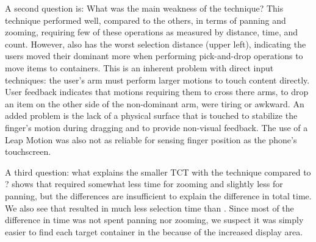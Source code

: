 A second question is: What was the main weakness of the  technique? This technique performed well, compared to the others, in terms of panning and zooming, requiring few of these operations as measured by distance, time, and count. However,  also has the worst selection distance  (upper left), indicating the users moved their dominant more when performing pick-and-drop operations to move items to containers. This is an inherent problem with direct input techniques: the user's arm must perform larger motions to touch content directly. User feedback indicates that motions requiring them to cross there arms, to drop an item on the other side of the non-dominant arm, were tiring or awkward. An added problem is the lack of a physical surface that is touched to stabilize the finger's motion during dragging and to provide non-visual feedback. The use of a Leap Motion was also not as reliable for sensing finger position as the phone's touchscreen.

A third question: what explains the smaller TCT with the  technique compared to ?  shows that  required somewhat less time for zooming and slightly less for panning, but the differences are insufficient to explain the difference in total time. We also see that  resulted in much less selection time than . Since most of the difference in time was not spent panning nor zooming, we suspect it was simply easier to find each target container in the  because of the increased display area.


